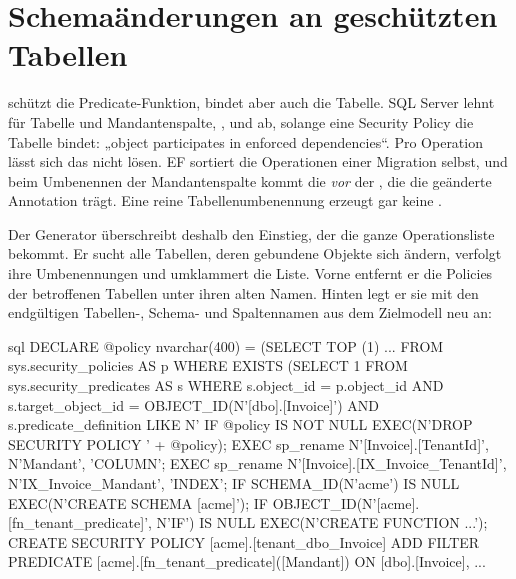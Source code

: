 \section{Schemaänderungen an geschützten Tabellen}\label{sec:sqlserver-schema-bound-changes}

 schützt die Predicate-Funktion, bindet aber auch die Tabelle. SQL Server
lehnt  für Tabelle und Mandantenspalte, ,  und 
ab, solange eine Security Policy die Tabelle bindet: „object participates in enforced
dependencies“. Pro Operation lässt sich das nicht lösen. EF sortiert die Operationen einer
Migration selbst, und beim Umbenennen der Mandantenspalte kommt die
 \emph{vor} der
, die die geänderte Annotation trägt. Eine
reine Tabellenumbenennung erzeugt gar keine .

Der Generator überschreibt deshalb den Einstieg, der die ganze Operationsliste bekommt. Er
sucht alle Tabellen, deren gebundene Objekte sich ändern, verfolgt ihre Umbenennungen und
umklammert die Liste. Vorne entfernt er die Policies der betroffenen Tabellen unter ihren alten
Namen. Hinten legt er sie mit den endgültigen Tabellen-, Schema- und Spaltennamen aus dem
Zielmodell neu an:

\begin{sourcecode}{sql}
DECLARE @policy nvarchar(400) = (SELECT TOP (1) ... FROM sys.security_policies AS p
    WHERE EXISTS (SELECT 1 FROM sys.security_predicates AS s WHERE s.object_id = p.object_id
        AND s.target_object_id = OBJECT_ID(N'[dbo].[Invoice]')
        AND s.predicate_definition LIKE N'%
IF @policy IS NOT NULL EXEC(N'DROP SECURITY POLICY ' + @policy);
EXEC sp_rename N'[Invoice].[TenantId]', N'Mandant', 'COLUMN';
EXEC sp_rename N'[Invoice].[IX_Invoice_TenantId]', N'IX_Invoice_Mandant', 'INDEX';
IF SCHEMA_ID(N'acme') IS NULL EXEC(N'CREATE SCHEMA [acme]');
IF OBJECT_ID(N'[acme].[fn_tenant_predicate]', N'IF') IS NULL EXEC(N'CREATE FUNCTION ...');
CREATE SECURITY POLICY [acme].[tenant_dbo_Invoice]
    ADD FILTER PREDICATE [acme].[fn_tenant_predicate]([Mandant]) ON [dbo].[Invoice], ...
\end{sourcecode}

